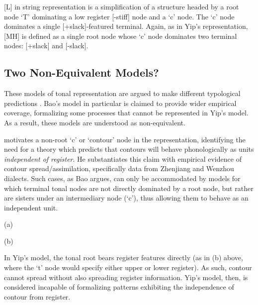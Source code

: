 \documentclass{article}
\begin{document}
[L] in string representation is a simplification of a structure headed by a root node `T' dominating a low register [-stiff] node and a `c' node. The `c' node dominates a single [+slack]-featured terminal. Again, as in Yip's representation, [MH] is defined as a single root node whose `c' node dominates two terminal nodes: [+slack] and [-slack].
\subsection{Two Non-Equivalent Models?}
These models of tonal representation are argued to make different typological predictions \citep{Bao1990, Chen2000}. Bao's model in particular is claimed to provide wider empirical coverage, formalizing some processes that cannot be represented in Yip's model. As a result, these models are understood as non-equivalent. \par
\citet[p.~95-6]{Bao1990} motivates a non-root `c' or `contour' node in the representation, identifying the need for a theory which predicts that contours will behave phonologically as units \emph{independent of register}. He substantiates this claim with empirical evidence of contour spread/assimilation, specifically data from Zhenjiang and Wenzhou dialects. Such cases, as Bao argues, can only be accommodated by models for which terminal tonal nodes are not directly dominated by a root node, but rather are sisters under an intermediary node (`c'), thus allowing them to behave as an independent unit.
\begin{center}
(a)
\hspace{1cm}
(b)
\end{center}
In Yip's model, the tonal root bears register features directly (as in (b) above, where the `t' node would specify either upper or lower register). As such, contour cannot spread without also spreading register information. Yip's model, then, is considered incapable of formalizing patterns exhibiting the independence of contour from register. \par
\end{document}
